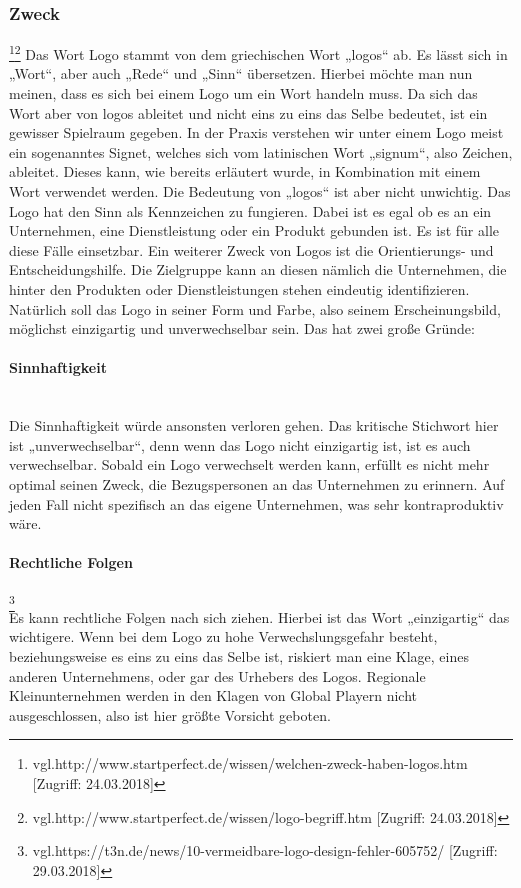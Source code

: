\subsubsection{Zweck}\footnote{\label{} vgl.http://www.startperfect.de/wissen/welchen-zweck-haben-logos.htm [Zugriff: 24.03.2018]}\footnote{\label{} vgl.http://www.startperfect.de/wissen/logo-begriff.htm [Zugriff: 24.03.2018]}
Das Wort Logo stammt von dem griechischen Wort „logos“ ab. Es lässt sich in „Wort“, aber auch „Rede“ und „Sinn“ übersetzen. Hierbei möchte man nun meinen, dass es sich bei einem Logo um ein Wort handeln muss. Da sich das Wort aber von logos ableitet und nicht eins zu eins das Selbe bedeutet, ist ein gewisser Spielraum gegeben. In der Praxis verstehen wir unter einem Logo meist ein sogenanntes Signet, welches sich vom latinischen Wort „signum“, also Zeichen, ableitet. Dieses kann, wie bereits erläutert wurde, in Kombination mit einem Wort verwendet werden. Die Bedeutung von „logos“ ist aber nicht unwichtig. Das Logo hat den Sinn als Kennzeichen zu fungieren. Dabei ist es egal ob es an ein Unternehmen, eine Dienstleistung oder ein Produkt gebunden ist. Es ist für alle diese Fälle einsetzbar. Ein weiterer Zweck von Logos ist die Orientierungs- und Entscheidungshilfe. Die Zielgruppe kann an diesen nämlich die Unternehmen, die hinter den Produkten oder Dienstleistungen stehen eindeutig identifizieren.
\\ 
Natürlich soll das Logo in seiner Form und Farbe, also seinem Erscheinungsbild, möglichst einzigartig und unverwechselbar sein. Das hat zwei große Gründe:

\paragraph{Sinnhaftigkeit}
\leavevmode \\
Die Sinnhaftigkeit würde ansonsten verloren gehen. Das kritische Stichwort hier ist „unverwechselbar“, denn wenn das Logo nicht einzigartig ist, ist es auch verwechselbar. Sobald ein Logo verwechselt werden kann, erfüllt es nicht mehr optimal seinen Zweck, die Bezugspersonen an das Unternehmen zu erinnern. Auf jeden Fall nicht spezifisch an das eigene Unternehmen, was sehr kontraproduktiv wäre.

\paragraph{Rechtliche Folgen}\footnote{\label{} vgl.https://t3n.de/news/10-vermeidbare-logo-design-fehler-605752/ [Zugriff: 29.03.2018]}
\leavevmode \\
Es kann rechtliche Folgen nach sich ziehen. Hierbei ist das Wort „einzigartig“ das wichtigere. Wenn bei dem Logo zu hohe Verwechslungsgefahr besteht, beziehungsweise es eins zu eins das Selbe ist, riskiert man eine Klage, eines anderen Unternehmens, oder gar des Urhebers des Logos. Regionale Kleinunternehmen werden in den Klagen von Global Playern nicht ausgeschlossen, also ist hier größte Vorsicht geboten.

